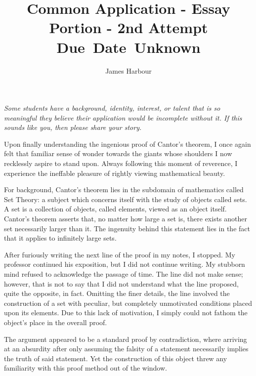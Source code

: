 \documentclass[12pt]{article}
\title{
    \vspace{2in}
    \textmd{\textbf{Common Application - Essay Portion - 2nd Attempt}}\\
    \normalsize\vspace{0.1in}\small{Due\ Date\ Unknown}\\
    \vspace{3in}
}
\author{James Harbour}
\begin{document}
\maketitle
\pagebreak
 \begin{center}

   \emph{Some students have a background, identity, interest, or talent that is so meaningful they believe their application would be incomplete without it. If this sounds like you, then please share your story.}

 \end{center}
\raggedright\setlength{\parindent}{0.5in}

Upon finally understanding the ingenious proof of Cantor’s theorem, I once again felt that familiar sense of wonder towards the giants whose shoulders I now recklessly aspire to stand upon. Always following this moment of reverence, I experience the ineffable pleasure of rightly viewing mathematical beauty.

For background, Cantor's theorem lies in the subdomain of mathematics called Set Theory: a subject which concerns itself with the study of objects called sets. A set is a collection of objects, called elements, viewed as an object itself. Cantor's theorem asserts that, no matter how large a set is, there exists another set necessarily larger than it. The ingenuity behind this statement lies in the fact that it applies to infinitely large sets.

After furiously writing the next line of the proof in my notes, I stopped. My professor continued his exposition, but I did not continue writing. My stubborn mind refused to acknowledge the passage of time. The line did not make sense; however, that is not to say that I did not understand what the line proposed, quite the opposite, in fact. Omitting the finer details, the line involved the construction of a set with peculiar, but completely unmotivated conditions placed upon its elements. Due to this lack of motivation, I simply could not fathom the object's place in the overall proof. %

The argument appeared to be a standard proof by contradiction, where arriving at an absurdity after only assuming the falsity of a statement necessarily implies the truth of said statement. Yet the construction of this object threw any familiarity with this proof method out of the window.
\end{document}
